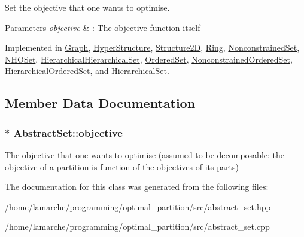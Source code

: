 Set the objective that one wants to optimise. 


\begin{DoxyParams}{Parameters}
{\em objective} & \-: The objective function itself \\
\hline
\end{DoxyParams}


Implemented in \hyperlink{classGraph_a294aff8b11a1b11dae2b4cd39b78b91d}{Graph}, \hyperlink{classHyperStructure_a744a8c5b7bf67dec8084c5d2b8a4927d}{Hyper\-Structure}, \hyperlink{classStructure2D_a85e5a4395ec60a75f3bcd1c7cacd6e2c}{Structure2\-D}, \hyperlink{classRing_af9bc7f0b325cbd2b6284aadeacdee6fb}{Ring}, \hyperlink{classNonconstrainedSet_a2d2b1ff5390c9c8bfa7e6e361ea1ddb1}{Nonconstrained\-Set}, \hyperlink{classNHOSet_ac1e59897d3af9dd6c019d6db9bb74dd1}{N\-H\-O\-Set}, \hyperlink{classHierarchicalHierarchicalSet_ae47e3171479131c47a2252b5c054ceef}{Hierarchical\-Hierarchical\-Set}, \hyperlink{classOrderedSet_a6051e561b7b5fcd1dc5ee8f9f67353fe}{Ordered\-Set}, \hyperlink{classNonconstrainedOrderedSet_a67a4a72a5e1bff3d46473757199455d9}{Nonconstrained\-Ordered\-Set}, \hyperlink{classHierarchicalOrderedSet_a813f90e2aff889461b9e089b7ff460bc}{Hierarchical\-Ordered\-Set}, and \hyperlink{classHierarchicalSet_aa555c69a5761820567bfe391969859d3}{Hierarchical\-Set}.



\subsection{Member Data Documentation}
\hypertarget{classAbstractSet_a0217447a042827703e1ea7655f0fc099}{
\subsubsection[{objective}]{$\ast$ Abstract\-Set\-::objective}}\label{classAbstractSet_a0217447a042827703e1ea7655f0fc099}
The objective that one wants to optimise (assumed to be decomposable\-: the objective of a partition is function of the objectives of its parts) 

The documentation for this class was generated from the following files\-:\begin{DoxyCompactItemize}
\item 
/home/lamarche/programming/optimal\-\_\-partition/src/\hyperlink{abstract__set_8hpp}{abstract\-\_\-set.\-hpp}\item 
/home/lamarche/programming/optimal\-\_\-partition/src/abstract\-\_\-set.\-cpp\end{DoxyCompactItemize}
